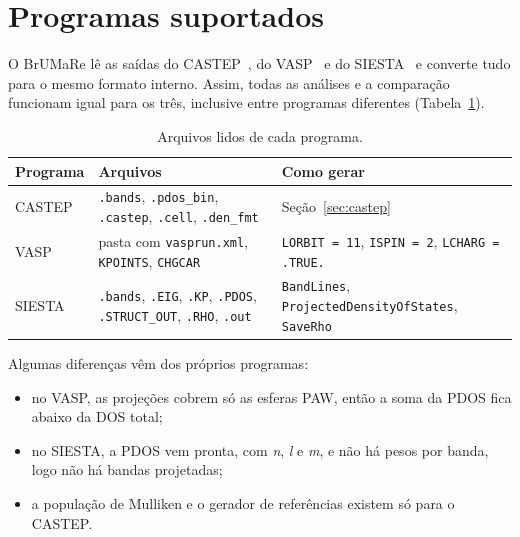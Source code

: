 \documentclass[11pt,a4paper]{article}
\newcommand{\cp}{\textsf{BrUMa\textcolor[HTML]{B26B00}{Re}}}
\begin{document}
\section{Programas suportados}
O \cp{} lê as saídas do CASTEP~\cite{clark2005castep}, do VASP~\cite{kresse1996vasp} e do SIESTA~\cite{soler2002siesta} e converte tudo para o mesmo formato interno. Assim, todas as análises e a comparação funcionam igual para os três, inclusive entre programas diferentes (Tabela~\ref{tab:programas}).
\begin{table}[h]\centering\small
\caption{Arquivos lidos de cada programa.}\label{tab:programas}
\begin{tabularx}{\linewidth}{lXX}\toprule
Programa & Arquivos & Como gerar\\\midrule
CASTEP & \texttt{.bands}, \texttt{.pdos\_bin}, \texttt{.castep}, \texttt{.cell}, \texttt{.den\_fmt} & Seção~\ref{sec:castep}\\
VASP & pasta com \texttt{vasprun.xml}, \texttt{KPOINTS}, \texttt{CHGCAR} & \texttt{LORBIT = 11}, \texttt{ISPIN = 2}, \texttt{LCHARG = .TRUE.}\\
SIESTA & \texttt{.bands}, \texttt{.EIG}, \texttt{.KP}, \texttt{.PDOS}, \texttt{.STRUCT\_OUT}, \texttt{.RHO}, \texttt{.out} & \texttt{BandLines}, \texttt{ProjectedDensityOfStates}, \texttt{SaveRho}\\\bottomrule
\end{tabularx}
\end{table}

Algumas diferenças vêm dos próprios programas:
\begin{itemize}
  \item no VASP, as projeções cobrem só as esferas PAW, então a soma da PDOS fica abaixo da DOS total;
  \item no SIESTA, a PDOS vem pronta, com \textit{n}, \textit{l} e \textit{m}, e não há pesos por banda, logo não há bandas projetadas;
  \item a população de Mulliken e o gerador de referências existem só para o CASTEP.
\end{itemize}
\end{document}
